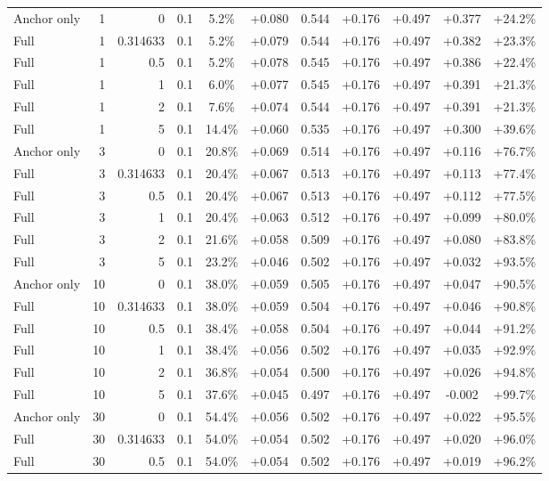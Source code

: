 \begin{table}[htbp]
\begin{tabular}{lrrrccccccc}
Anchor only & 1 & 0 & 0.1 & 5.2\% & +0.080 & 0.544 & +0.176 & +0.497 & +0.377 & +24.2\% \\
Full & 1 & 0.314633 & 0.1 & 5.2\% & +0.079 & 0.544 & +0.176 & +0.497 & +0.382 & +23.3\% \\
Full & 1 & 0.5 & 0.1 & 5.2\% & +0.078 & 0.545 & +0.176 & +0.497 & +0.386 & +22.4\% \\
Full & 1 & 1 & 0.1 & 6.0\% & +0.077 & 0.545 & +0.176 & +0.497 & +0.391 & +21.3\% \\
Full & 1 & 2 & 0.1 & 7.6\% & +0.074 & 0.544 & +0.176 & +0.497 & +0.391 & +21.3\% \\
Full & 1 & 5 & 0.1 & 14.4\% & +0.060 & 0.535 & +0.176 & +0.497 & +0.300 & +39.6\% \\
Anchor only & 3 & 0 & 0.1 & 20.8\% & +0.069 & 0.514 & +0.176 & +0.497 & +0.116 & +76.7\% \\
Full & 3 & 0.314633 & 0.1 & 20.4\% & +0.067 & 0.513 & +0.176 & +0.497 & +0.113 & +77.4\% \\
Full & 3 & 0.5 & 0.1 & 20.4\% & +0.067 & 0.513 & +0.176 & +0.497 & +0.112 & +77.5\% \\
Full & 3 & 1 & 0.1 & 20.4\% & +0.063 & 0.512 & +0.176 & +0.497 & +0.099 & +80.0\% \\
Full & 3 & 2 & 0.1 & 21.6\% & +0.058 & 0.509 & +0.176 & +0.497 & +0.080 & +83.8\% \\
Full & 3 & 5 & 0.1 & 23.2\% & +0.046 & 0.502 & +0.176 & +0.497 & +0.032 & +93.5\% \\
Anchor only & 10 & 0 & 0.1 & 38.0\% & +0.059 & 0.505 & +0.176 & +0.497 & +0.047 & +90.5\% \\
Full & 10 & 0.314633 & 0.1 & 38.0\% & +0.059 & 0.504 & +0.176 & +0.497 & +0.046 & +90.8\% \\
Full & 10 & 0.5 & 0.1 & 38.4\% & +0.058 & 0.504 & +0.176 & +0.497 & +0.044 & +91.2\% \\
Full & 10 & 1 & 0.1 & 38.4\% & +0.056 & 0.502 & +0.176 & +0.497 & +0.035 & +92.9\% \\
Full & 10 & 2 & 0.1 & 36.8\% & +0.054 & 0.500 & +0.176 & +0.497 & +0.026 & +94.8\% \\
Full & 10 & 5 & 0.1 & 37.6\% & +0.045 & 0.497 & +0.176 & +0.497 & -0.002 & +99.7\% \\
Anchor only & 30 & 0 & 0.1 & 54.4\% & +0.056 & 0.502 & +0.176 & +0.497 & +0.022 & +95.5\% \\
Full & 30 & 0.314633 & 0.1 & 54.0\% & +0.054 & 0.502 & +0.176 & +0.497 & +0.020 & +96.0\% \\
Full & 30 & 0.5 & 0.1 & 54.0\% & +0.054 & 0.502 & +0.176 & +0.497 & +0.019 & +96.2\% \\

\end{tabular}
\end{table}

